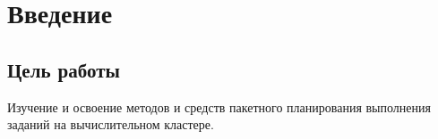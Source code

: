 \chapter{Введение}

\section{Цель работы}
Изучение и освоение методов и средств пакетного планирования выполнения заданий на вычислительном кластере.